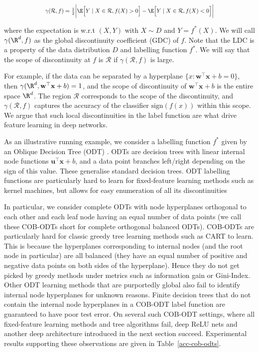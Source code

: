 \documentclass{article} %
\renewcommand{\>}{{\rightarrow}}
\renewcommand{\=}{\stackrel{\triangle}{=}}
\newcommand{\0}{{\mathbf 0}}
\newcommand{\cR}{{\mathcal R}}
\newcommand{\w}{{\mathbf w}}
\newcommand{\x}{{\mathbf x}}
\newcommand{\bu}{{\mathbf u}}
\begin{document}
\[
\resizebox{0.7\textwidth}{!}{$
\gamma(\cR, f) = \frac{1}{2} \bigg\vert \E \Big[Y \mid X \in \cR, f(X)>0\Big] - \E\Big[Y \mid X \in \cR, f(X)<0 \Big] \bigg \vert
$}
\]



where the expectation is w.r.t $(X,Y)$ with $X \sim D$ and $Y=f^*(X)$. We will call $\gamma(\R^d, f)$ as the global discontinuity coefficient (GDC) of $f$. Note that the LDC is a property of the data distribution $D$ and labelling function $f^*$. We will say that the scope of discontinuity at $f$ is $\cR$ if $\gamma(\cR, f)$ is large.

For example, if the data can be separated by a hyperplane $\{x: \w^\top \x + b = 0 \}$, then $\gamma(\R^d, \w^\top \x+b) = 1$, and the scope of discontinuity of $\w^\top \x +b $ is the entire space $\R^d$. The region $\cR$ corresponds to the scope of the discontinuity, and $\gamma(\cR, f)$ captures the accuracy of the classifier $\text{sign}(f(x))$ within this scope. We argue that such local discontinuities in the label function are what drive feature learning in deep networks. 

As an illustrative running example, we consider a labelling function $f^*$ given by an Oblique Decision Tree (ODT) \citep{bertsimas2017optimal, murthy1993oc1, murthy1994system, wickramarachchi2016hhcart, carreira2018alternating}. ODTs are decision trees with linear internal node functions $\bu^\top \x + b$, and a data point branches left/right depending on the sign of this value. These generalise standard decision trees. ODT labelling functions are particularly hard to learn for fixed-feature learning methods such as kernel machines, but allows for easy enumeration of all its discontinuities 

In particular, we consider complete ODTs with node hyperplanes orthogonal to each other and each leaf node having an equal number of data points (we call these COB-ODTs short for complete orthogonal balanced ODTs).  COB-ODTs are particularly hard for classic greedy tree learning methods such as CART \citep{breiman1984classification} to learn. This is because the hyperplanes corresponding to internal nodes (and the root node in particular) are all balanced (they have an equal number of positive and negative data points on both sides of the hyperplane). Hence they do not get picked by greedy methods under metrics such as information gain or Gini-Index. Other ODT learning methods that are purportedly global \citep{Zantedeschi2020LearningBD,bertsimas2017optimal,lee2019} also fail to identify internal node hyperplanes for unknown reasons. Finite decision trees that do not contain the internal node hyperplanes in a COB-ODT label function are guaranteed to have poor test error. On several such COB-ODT settings, where all fixed-feature learning methods and tree algorithms fail, deep ReLU nets and another deep architecture introduced in the next section succeed. Experimental results supporting these observations are given in Table~\ref{acc-cob-odts}. 
\end{document}
